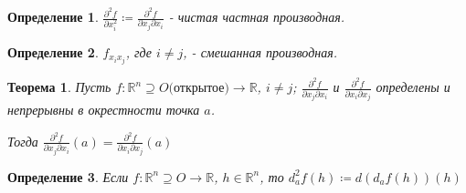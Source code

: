 \documentclass[11pt,a4paper,oneside]{scrartcl}
\newtheorem{definition}{Определение}
\newtheorem{theorem}{Теорема}
\begin{document}
\begin{definition}
    $\frac{\partial^2 f}{\partial x_i^2} \coloneqq \frac{\partial^2 f}{\partial x_j \partial x_i}$
        - чистая частная производная.
\end{definition}

\begin{definition}
    $f_{x_i x_j}$, где $i \neq j$, - смешанная производная.
\end{definition}

\begin{theorem}
    Пусть $f: \mathbb{R}^n \supseteq O \text{(открытое)} \rightarrow \mathbb{R}$, $i \neq j$;
    $\frac{\partial^2 f}{\partial x_j \partial x_i}$
    и $\frac{\partial^2 f}{\partial x_i \partial x_j}$
    определены и непрерывны в окрестности точка $a$.

    Тогда $\frac{\partial^2 f}{\partial x_j \partial x_i}(a)
        = \frac{\partial^2 f}{\partial x_i \partial x_j}(a)$
\end{theorem}

\begin{definition}
    Если $f: \mathbb{R}^n \supseteq O \rightarrow \mathbb{R}$, $h \in \mathbb{R}^n$,
    то $d_a^2 f(h) \coloneqq d(d_a f(h))(h)$
\end{definition}
\end{document}
